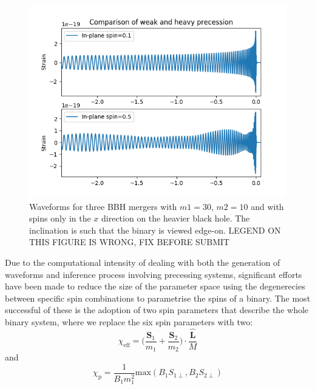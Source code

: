 \documentclass[11pt]{article}
\begin{document}
\begin{figure}
	\includegraphics[scale=1]{fig7.png}
	\centering
	\caption{Waveforms for three BBH mergers with $m1=30$, $m2=10$ and with spins only in the $x$ direction on the heavier black hole. The inclination is such that the binary is viewed edge-on. LEGEND ON THIS FIGURE IS WRONG, FIX BEFORE SUBMIT}
	\centering
\end{figure}
Due to the computational intensity of dealing with both the generation of waveforms and inference process involving precessing systems, significant efforts have been made to reduce the size of the parameter space using the degenerecies between specific spin combinations to parametrise the spins of a binary. The most successful of these is the adoption of two spin parameters\cite{imr}\cite{chip} that describe the whole binary system, where we replace the six spin parameters with two:
\begin{equation}
\chi_{\text{eff}}=\bigg(\frac{\mathbf{S}_1}{m_1}+\frac{\mathbf{S}_2}{m_2}\bigg)\cdot\frac{\mathbf{\hat{L}}}{M}
\end{equation}
and
\begin{equation}
\chi_\text{p}=\frac{1}{B_1m^2_1}\text{max}(B_1S_{1\perp},B_2S_{2\perp})
\end{equation}
\end{document}

